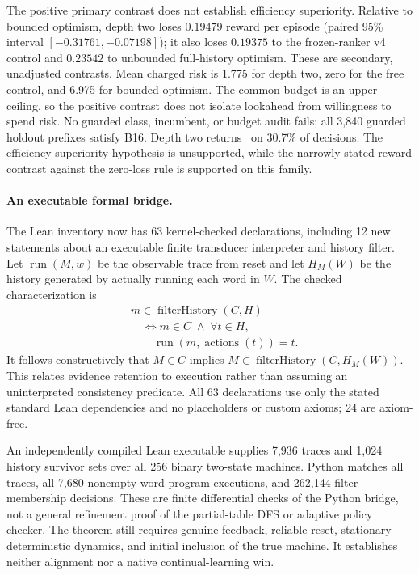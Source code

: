 

The positive primary contrast does not establish efficiency superiority. Relative
to bounded optimism, depth two loses $0.19479$ reward per episode (paired 95\%
interval $[-0.31761,-0.07198]$); it also loses $0.19375$ to the frozen-ranker v4
control and $0.23542$ to unbounded full-history optimism. These are secondary,
unadjusted contrasts. Mean charged risk is 1.775 for depth two, zero for the free
control, and 6.975 for bounded optimism. The common budget is an upper ceiling,
so the positive contrast does not isolate lookahead from willingness to spend
risk. No guarded class, incumbent, or budget audit fails; all 3,840 guarded
holdout prefixes satisfy B16. Depth two returns \unk\ on 30.7\% of decisions.
The efficiency-superiority hypothesis is unsupported, while the narrowly stated
reward contrast against the zero-loss rule is supported on this family.

\paragraph{An executable formal bridge.}
The Lean inventory now has 63 kernel-checked declarations, including 12 new
statements about an executable finite transducer interpreter and history filter.
Let $\operatorname{run}(M,w)$ be the observable trace from reset and let
$H_M(W)$ be the history generated by actually running each word in $W$.
The checked characterization is
\[
\begin{aligned}
&m\in\operatorname{filterHistory}(C,H)\\
&\quad\iff m\in C\;\land\;\forall t\in H,\\
&\qquad\operatorname{run}(m,\operatorname{actions}(t))=t.
\end{aligned}
\]
It follows constructively that $M\in C$ implies
$M\in\operatorname{filterHistory}(C,H_M(W))$. This relates evidence retention
to execution rather than assuming an uninterpreted consistency predicate.
All 63 declarations use only the stated standard Lean dependencies and no
placeholders or custom axioms; 24 are axiom-free.

An independently compiled Lean executable supplies 7,936 traces and 1,024
history survivor sets over all 256 binary two-state machines. Python matches
all traces, all 7,680 nonempty word-program executions, and 262,144 filter
membership decisions. These are finite differential checks of the Python
bridge, not a general refinement proof of the partial-table DFS or adaptive
policy checker. The theorem still requires genuine feedback, reliable reset,
stationary deterministic dynamics, and initial inclusion of the true machine.
It establishes neither alignment nor a native continual-learning win.
